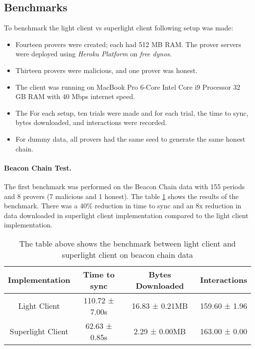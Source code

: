 \documentclass[a4paper,11pt,oneside]{article}
\theoremstyle{definition}
\begin{document}
 \subsection{Benchmarks}
 To benchmark the light client vs superlight client following setup was made:
 \begin{itemize}
     \item Fourteen provers were created; each had 512 MB RAM. The prover servers were deployed using \textit{Heroku Platform} on \textit{free dynos}.
     \item Thirteen provers were malicious, and one prover was honest. 
     \item The client was running on MacBook Pro 6-Core Intel Core i9 Processor 32 GB RAM with 40 Mbps internet speed.
    \item The For each setup, ten trials were made and for each trial, the time to sync, bytes downloaded, and interactions were recorded.
    \item For dummy data, all provers had the same seed to generate the same honest chain.
 \end{itemize}
  \paragraph{Beacon Chain Test.} The first benchmark was performed on the Beacon Chain data with 155 periods and 8 provers (7 malicious and 1 honest). The table \ref{table:beacon-chain} shows the results of the benchmark. There was a 40\% reduction in time to sync and an 8x reduction in data downloaded in superlight client implementation compared to the light client implementation.
  \begin{table}[h]
  \centering
  \begin{tabular}{|c | c |c | c|} 
  \hline
  Implementation & Time to sync & Bytes Downloaded & Interactions \\ [0.5ex] 
  \hline
  Light Client & 110.72 ± 7.00s & 16.83 ± 0.21MB & 159.60 ± 1.96 \\
  Superlight Client & 62.63 ± 0.85s & 2.29 ± 0.00MB & 163.00 ± 0.00 \\ [0.5ex]  
  \hline
  \end{tabular}
  \caption{The table above shows the benchmark between light client and superlight client on beacon chain data}
  \label{table:beacon-chain}
  \end{table}
  
\end{document}
